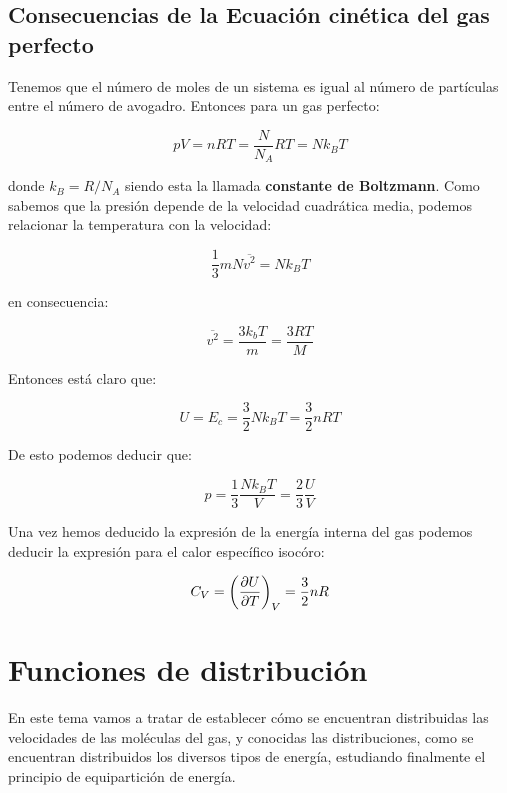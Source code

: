 \documentclass[12pt]{book}
\begin{document}
\section{Consecuencias de la Ecuación cinética del gas perfecto}

Tenemos que el número de moles de un sistema es igual al número de partículas entre el número de avogadro. Entonces para un gas perfecto:

\begin{equation}
p V = n RT = \dfrac{N}{N_A} RT = N k_B T
\end{equation}

donde $k_B = R/N_A$ siendo esta la llamada \textbf{constante de Boltzmann}. Como sabemos que la presión depende de la velocidad cuadrática media, podemos relacionar la temperatura con la velocidad:

$$ \dfrac{1}{3} m N \overline{v^2} = N k_B T $$

en consecuencia:

\begin{equation}
\overline{v^2} = \dfrac{3 k_b T}{m} = \dfrac{3 R T}{M}
\end{equation}

Entonces está claro que: 

\begin{equation}
U = E_c = \dfrac{3}{2} N k_B T = \dfrac{3}{2} n RT
\end{equation}

De esto podemos deducir que: 

\begin{equation}
p = \dfrac{1}{3} \dfrac{N k_B T}{V} = \dfrac{2}{3} \dfrac{U}{V}
\end{equation}

Una vez hemos deducido la expresión de la energía interna del gas podemos deducir la expresión para el calor específico isocóro:

\begin{equation}
C_V = \left( \frac{\partial U}{\partial T} \right)_V = \dfrac{3}{2} n R
\end{equation}

\chapter{Funciones de distribución}

En este tema vamos a tratar de establecer cómo se encuentran distribuidas las velocidades de las moléculas del gas, y conocidas las distribuciones, como se encuentran distribuidos los diversos tipos de energía, estudiando finalmente el principio de equipartición de energía.
\end{document}
